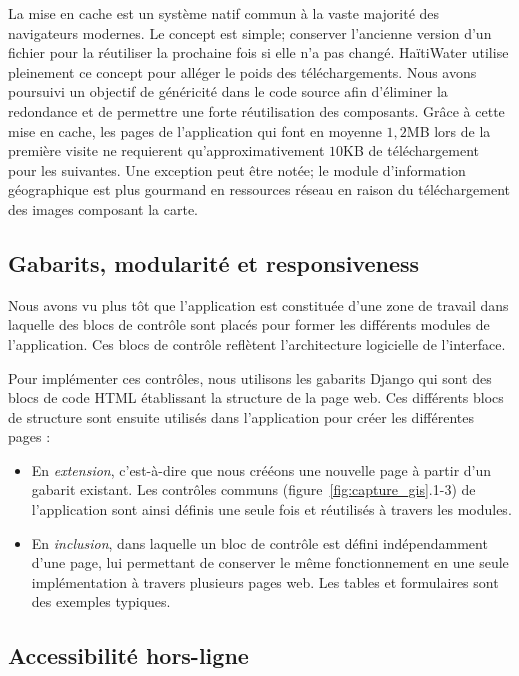 \documentclass{EPL-master-thesis-covers-FR}
\begin{document}
				La mise en cache est un système natif commun à la vaste majorité des navigateurs modernes. Le concept est simple; conserver l'ancienne version d'un fichier pour la réutiliser la prochaine fois si elle n'a pas changé. HaïtiWater utilise pleinement ce concept pour alléger le poids des téléchargements. Nous avons poursuivi un objectif de généricité dans le code source afin d'éliminer la redondance et de permettre une forte réutilisation des composants. Grâce à cette mise en cache, les pages de l'application qui font en moyenne $1,2$MB lors de la première visite ne requierent qu'approximativement $10$KB de téléchargement pour les suivantes. Une exception peut être notée; le module d'information géographique est plus gourmand en ressources réseau en raison du téléchargement des images composant la carte.

			\subsection*{Gabarits, modularité et responsiveness}
				Nous avons vu plus tôt que l'application est constituée d'une zone de travail dans laquelle des blocs de contrôle sont placés pour former les différents modules de l'application. Ces blocs de contrôle reflètent l'architecture logicielle de l'interface.

				Pour implémenter ces contrôles, nous utilisons les gabarits Django qui sont des blocs de code HTML établissant la structure de la page web. Ces différents blocs de structure sont ensuite utilisés dans l'application pour créer les différentes pages :
				\begin{itemize}
					\item En \emph{extension}, c'est-à-dire que nous crééons une nouvelle page à partir d'un gabarit existant. Les contrôles communs (figure~\ref{fig:capture_gis}.1-3) de l'application sont ainsi définis une seule fois et réutilisés à travers les modules.
					\item En \emph{inclusion}, dans laquelle un bloc de contrôle est défini indépendamment d'une page, lui permettant de conserver le même fonctionnement en une seule implémentation à travers plusieurs pages web. Les tables et formulaires sont des exemples typiques.
				\end{itemize}

			\subsection*{Accessibilité hors-ligne}
				\label{sec:service_worker}
\end{document}
